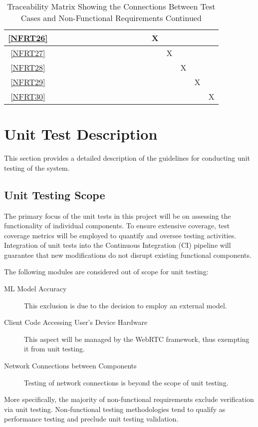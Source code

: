 \documentclass[12pt, titlepage]{article}
\begin{document}
\begin{landscape}
\begin{table}[h!]
\begin{tabular}{|c|c|c|c|c|c|c|c|c|c|c|c|c|c|c|c|c|c|}
      \ref{NFRT26} &      &      &     &     &     &     &     &     &     &     &     &     & X   &     &     &     &     \\ \hline
      \ref{NFRT27} &      &      &     &     &     &     &     &     &     &     &     &     &     & X   &     &     &     \\ \hline
      \ref{NFRT28} &      &      &     &     &     &     &     &     &     &     &     &     &     &     & X   &     &     \\ \hline
      \ref{NFRT29} &      &      &     &     &     &     &     &     &     &     &     &     &     &     &     & X   &     \\ \hline
      \ref{NFRT30} &      &      &     &     &     &     &     &     &     &     &     &     &     &     &     &     & X   \\ \hline
    \end{tabular}
    \caption{Traceability Matrix Showing the Connections Between Test Cases
      and Non-Functional Requirements Continued}
    \label{tab:nfrt2}
  \end{table}
\end{landscape}
\restoregeometry

\section{Unit Test Description}

This section provides a detailed description of the guidelines for conducting
unit testing of the system.

\subsection{Unit Testing Scope}

The primary focus of the unit tests in this project will be on assessing the
functionality of individual components. To ensure extensive coverage, test
coverage metrics will be employed to quantify and oversee testing activities.
Integration of unit tests into the Continuous Integration (CI) pipeline will
guarantee that new modifications do not disrupt existing functional components.

The following modules are considered out of scope for unit testing:
\begin{description}
\item[ML Model Accuracy] This exclusion is due to the decision to employ an
  external model.
\item[Client Code Accessing User's Device Hardware] This aspect will be managed by
  the WebRTC framework, thus exempting it from unit testing.
\item[Network Connections between Components] Testing of network connections is
  beyond the scope of unit testing.

\end{description}
More specifically, the majority of non-functional requirements exclude
verification via unit testing. Non-functional testing methodologies tend to
qualify as performance testing and preclude unit testing validation.
\end{document}
